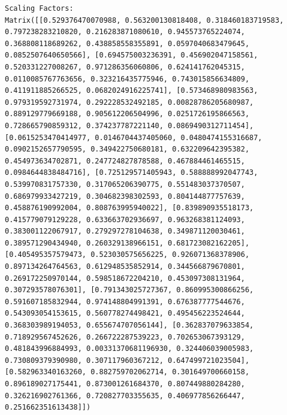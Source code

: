 \documentclass[
  letterpaper,
  DIV=11,
  numbers=noendperiod]{scrreprt}
\theoremstyle{plain}
\theoremstyle{definition}
\theoremstyle{remark}
\begin{document}
\begin{verbatim}
Scaling Factors:
Matrix([[0.529376470070988, 0.563200130818408, 0.318460183719583, 0.797238283210820, 0.216283871080610, 0.945573765224074, 0.368808118689262, 0.438858558355891, 0.0597040683479645, 0.0852507640650566], [0.694575003236391, 0.456902047158561, 0.520331227008267, 0.971286356060806, 0.624141762045315, 0.0110085767763656, 0.323216435775946, 0.743015856634809, 0.411911885266525, 0.0682024916225741], [0.573468980983563, 0.979319592731974, 0.292228532492185, 0.00828786205680987, 0.889129779669188, 0.905612206504996, 0.0251726195866563, 0.728665790859312, 0.374237787221140, 0.0869490312711454], [0.0615253470414977, 0.0146704437405060, 0.0480474155316687, 0.0902152657790595, 0.349422750680181, 0.632209642395382, 0.454973634702871, 0.247724827878588, 0.467884461465515, 0.0984644838484716], [0.725129571405943, 0.588888992047743, 0.539970831757330, 0.317065206390775, 0.551483037370507, 0.686979933427219, 0.304682398302593, 0.804144877757639, 0.458876190992004, 0.808763995940022], [0.839890935518173, 0.415779079129228, 0.633663702936697, 0.963268381124093, 0.383001122067917, 0.279297278104638, 0.349871120030461, 0.389571290434940, 0.260329138966151, 0.681723082162205], [0.405495357579473, 0.523030575656225, 0.926071368378906, 0.897134264764563, 0.612948535852914, 0.344566879670801, 0.269172250970144, 0.598518672204210, 0.453097308131964, 0.307293578076301], [0.791343025727367, 0.860995300866256, 0.591607185832944, 0.974148804991391, 0.676387777544676, 0.543093054153615, 0.560778274498421, 0.495456223524644, 0.368303989194053, 0.655674707056144], [0.362837079633854, 0.718929567452626, 0.266722287539223, 0.702653067393129, 0.481843996884993, 0.00331370681196930, 0.324406039005983, 0.730809379390980, 0.307117960367212, 0.647499721023504], [0.582963340163260, 0.882759702062714, 0.301649700660158, 0.896189027175441, 0.873001261684370, 0.807449880284280, 0.326216902761366, 0.720827703355635, 0.406977856266447, 0.251662351613438]])


\end{verbatim}
\end{document}
